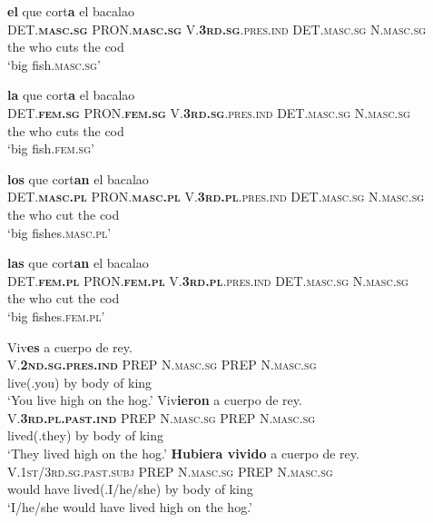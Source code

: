 \documentclass[output=paper]{langsci/langscibook}
\begin{document}
\begin{exe}
\ex
	\begin{xlist}
	\ex \label{ex:bacalaoA}
    \glll \textbf{el} que cort\textbf{a} el bacalao\\
    \textsc{DET.\textbf{masc.sg}} \textsc{PRON.\textbf{masc.sg}} \textsc{V.\textbf{3rd.sg}.pres.ind} \textsc{DET.masc.sg} \textsc{N.masc.sg}\\
    the who cuts the cod \\
    \glt `big fish.\textsc{masc.sg}'
    
    \ex \label{ex:bacalaoB}
    \glll \textbf{la} que cort\textbf{a} el bacalao\\
    \textsc{DET.\textbf{fem.sg}} \textsc{PRON.\textbf{fem.sg}} \textsc{V.\textbf{3rd.sg}.pres.ind} \textsc{DET.masc.sg} \textsc{N.masc.sg}\\
    the who cuts the cod \\
    \glt `big fish.\textsc{fem.sg}'
    
    \ex \label{ex:bacalaoC}
    \glll \textbf{los} que cort\textbf{an} el bacalao\\
   \textsc{DET.\textbf{masc.pl}} \textsc{PRON.\textbf{masc.pl}} \textsc{V.\textbf{3rd.pl}.pres.ind} 
   \textsc{DET.masc.sg} \textsc{N.masc.sg}\\
    the who cut the cod \\
    \glt `big fishes.\textsc{masc.pl}'
    
    \ex \label{ex:bacalaoD}
    \glll \textbf{las} que cort\textbf{an} el bacalao\\
    \textsc{DET.\textbf{fem.pl}} \textsc{PRON.\textbf{fem.pl}} \textsc{V.\textbf{3rd.pl}.pres.ind }
    \textsc{DET.masc.sg} \textsc{N.masc.sg}\\
    the who cut the cod \\
    \glt `big fishes.\textsc{fem.pl}'
	\end{xlist}
	
\ex
	\begin{xlist}
	\ex \label{ex:reyA}
    \glll Viv\textbf{es} a cuerpo de rey.\\
    \textsc{V.\textbf{2nd.sg.pres.ind}} \textsc{PREP} \textsc{N.masc.sg} \textsc{PREP} \textsc{N.masc.sg} \\
    {live(.you)} by body of king\\
    \glt `You live high on the hog.'
    \ex \label{ex:reyB}
    \glll Viv\textbf{ieron} a cuerpo de rey.\\
   \textsc{V.\textbf{3rd.pl.past.ind}}  \textsc{PREP} \textsc{N.masc.sg} \textsc{PREP} \textsc{N.masc.sg} \\
    {lived(.they)} by body of king\\
    \glt `They lived high on the hog.'
    \ex \label{ex:reyC}
    \glll \textbf{Hubiera vivido} a cuerpo de rey.\\
    \textsc{V.1st/3rd.sg.past.subj} \textsc{PREP} \textsc{N.masc.sg} \textsc{PREP} \textsc{N.masc.sg} \\
    {would have lived(.I/he/she)} by body of king\\
    \glt `I/he/she would have lived high on the hog.'
	\end{xlist}
\end{exe}
\end{document}
